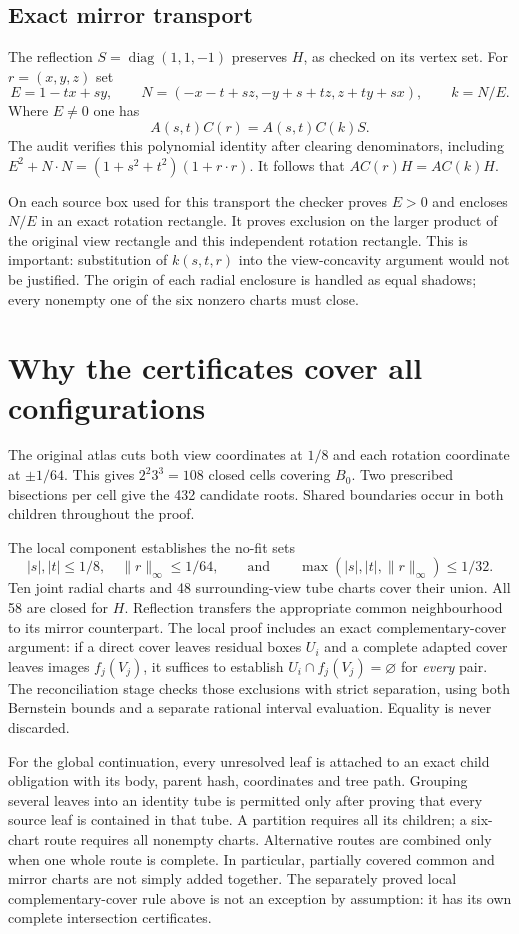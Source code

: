 \documentclass[11pt,a4paper]{article}
\newcommand{\HH}{H}
\begin{document}
\subsection{Exact mirror transport}
The reflection $S=\operatorname{diag}(1,1,-1)$ preserves $\HH$, as checked on its
vertex set. For $r=(x,y,z)$ set
\[
 E=1-tx+sy,\qquad
 N=(-x-t+sz,-y+s+tz,z+ty+sx),\qquad k=N/E.
\]
Where $E\ne0$ one has
\begin{equation}\label{eq:mirror}
 A(s,t)C(r)=A(s,t)C(k)S.
\end{equation}
The audit verifies this polynomial identity after clearing denominators,
including $E^2+N\cdot N=(1+s^2+t^2)(1+r\cdot r)$.
It follows that $AC(r)\HH=AC(k)\HH$.

On each source box used for this transport the checker proves $E>0$ and encloses
$N/E$ in an exact rotation rectangle. It proves exclusion on the larger product
of the original view rectangle and this independent rotation rectangle.
This is important: substitution of $k(s,t,r)$ into the view-concavity argument
would not be justified. The origin of each radial enclosure is handled as equal
shadows; every nonempty one of the six nonzero charts must close.

\section{Why the certificates cover all configurations}
The original atlas cuts both view coordinates at $1/8$ and each rotation
coordinate at $\pm1/64$. This gives $2^2 3^3=108$ closed cells covering $B_0$.
Two prescribed bisections per cell give the 432 candidate roots. Shared
boundaries occur in both children throughout the proof.

The local component establishes the no-fit sets
\[
 |s|,|t|\le1/8,\quad\|r\|_\infty\le1/64,
 \qquad\text{and}\qquad
 \max(|s|,|t|,\|r\|_\infty)\le1/32.
\]
Ten joint radial charts and 48 surrounding-view tube charts cover their union.
All 58 are closed for $\HH$. Reflection transfers the appropriate common
neighbourhood to its mirror counterpart. The local proof includes an exact
complementary-cover argument: if a direct cover leaves residual boxes $U_i$
and a complete adapted cover leaves images $f_j(V_j)$, it suffices to establish
$U_i\cap f_j(V_j)=\varnothing$ for \emph{every} pair. The reconciliation stage
checks those exclusions with strict separation, using both Bernstein bounds and
a separate rational interval evaluation. Equality is never discarded.

For the global continuation, every unresolved leaf is attached to an exact
child obligation with its body, parent hash, coordinates and tree path.
Grouping several leaves into an identity tube is permitted only after proving
that every source leaf is contained in that tube. A partition requires all its
children; a six-chart route requires all nonempty charts. Alternative routes
are combined only when one whole route is complete. In particular, partially
covered common and mirror charts are not simply added together. The separately
proved local complementary-cover rule above is not an exception by assumption:
it has its own complete intersection certificates.
\end{document}
